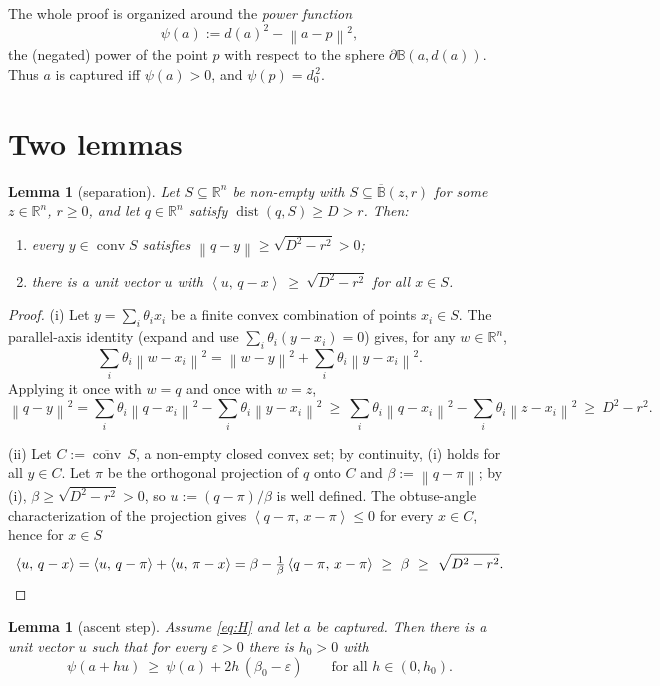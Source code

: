 \documentclass[11pt]{article}
\newtheorem{lemma}[theorem]{Lemma}
\theoremstyle{remark}
\newcommand{\R}{\mathbb{R}}
\newcommand{\B}{\mathbb{B}}
\newcommand{\conv}{\operatorname{conv}}
\newcommand{\cconv}[1]{\overline{\conv}\,#1}
\newcommand{\dist}{\operatorname{dist}}
\newcommand{\sca}[2]{\left\langle #1,\, #2\right\rangle}
\newcommand{\norm}[1]{\left\lVert #1\right\rVert}
\newcommand{\Bcl}[2]{\overline{\B}(#1,#2)}
\begin{document}
The whole proof is organized around the \emph{power function}
\[
\psi(a):=d(a)^2-\norm{a-p}^2 ,
\]
the (negated) power of the point $p$ with respect to the sphere $\partial\B(a,d(a))$. Thus
$a$ is captured iff $\psi(a)>0$, and $\psi(p)=d_0^{\,2}$.

\section{Two lemmas}

\begin{lemma}[separation]\label{lem:sep}
Let $S\subseteq\R^n$ be non-empty with $S\subseteq\Bcl{z}{r}$ for some $z\in\R^n$, $r\ge0$, and
let $q\in\R^n$ satisfy $\dist(q,S)\ge D>r$. Then:
\begin{enumerate}[label=(\roman*)]
\item every $y\in\conv S$ satisfies $\norm{q-y}\ge\sqrt{D^2-r^2}>0$;
\item there is a unit vector $u$ with
$\sca{u}{q-x}\ \ge\ \sqrt{D^2-r^2}$ for all $x\in S$.
\end{enumerate}
\end{lemma}

\begin{proof}
(i) Let $y=\sum_i\theta_i x_i$ be a finite convex combination of points $x_i\in S$. The
parallel-axis identity (expand and use $\sum_i\theta_i(y-x_i)=0$) gives, for any $w\in\R^n$,
\[
\sum_i\theta_i\norm{w-x_i}^2=\norm{w-y}^2+\sum_i\theta_i\norm{y-x_i}^2 .
\]
Applying it once with $w=q$ and once with $w=z$,
\[
\norm{q-y}^2=\sum_i\theta_i\norm{q-x_i}^2-\sum_i\theta_i\norm{y-x_i}^2
\ \ge\ \sum_i\theta_i\norm{q-x_i}^2-\sum_i\theta_i\norm{z-x_i}^2
\ \ge\ D^2-r^2 .
\]

(ii) Let $C:=\cconv S$, a non-empty closed convex set; by continuity, (i) holds for all $y\in C$.
Let $\pi$ be the orthogonal projection of $q$ onto $C$ and $\beta:=\norm{q-\pi}$; by (i),
$\beta\ge\sqrt{D^2-r^2}>0$, so $u:=(q-\pi)/\beta$ is well defined. The obtuse-angle
characterization of the projection gives $\sca{q-\pi}{x-\pi}\le 0$ for every $x\in C$, hence for
$x\in S$
\[
\sca{u}{q-x}=\sca{u}{q-\pi}+\sca{u}{\pi-x}
=\beta-\tfrac1\beta\sca{q-\pi}{x-\pi}\ \ge\ \beta\ \ge\ \sqrt{D^2-r^2}. \qedhere
\]
\end{proof}

\begin{lemma}[ascent step]\label{lem:step}
Assume \eqref{eq:H} and let $a$ be captured. Then there is a unit vector $u$ such that for every
$\varepsilon>0$ there is $h_0>0$ with
\[
\psi(a+hu)\ \ge\ \psi(a)+2h\,(\beta_0-\varepsilon)
\qquad\text{for all } h\in(0,h_0).
\]
\end{lemma}
\end{document}
